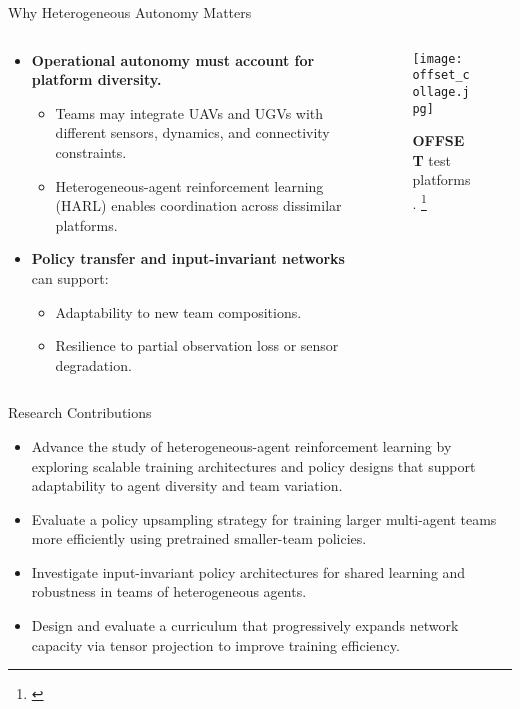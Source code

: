 \documentclass[xcolor={svgnames},aspectratio=169]{beamer}
\begin{document}
\begin{frame}{Why Heterogeneous Autonomy Matters}
\begin{columns}
    \begin{column}{0.6\textwidth}
    \begin{itemize}
        \item \textbf{Operational autonomy must account for platform diversity.}
        \begin{itemize}
            \item Teams may integrate UAVs and UGVs with different sensors, dynamics, and connectivity constraints.
            \item Heterogeneous-agent reinforcement learning (HARL) enables coordination across dissimilar platforms.
        \end{itemize}
        \item \textbf{Policy transfer and input-invariant networks} can support:
        \begin{itemize}
            \item Adaptability to new team compositions.
            \item Resilience to partial observation loss or sensor degradation.
        \end{itemize}
    \end{itemize}
    \end{column}
    \begin{column}{0.4\textwidth}
        \begin{figure}[!h]
            \centering
            \texttt{[image: offset\_collage.jpg]}
            \caption{\textbf{OFFSET} test platforms.
                \footnote[frame]{\cite{zotero-2835}}}
            \label{fig:offset_collage}
        \end{figure}
    \end{column}
\end{columns}
\end{frame}


\begin{frame}{Research Contributions}
    \begin{itemize}
        \item {%
            Advance the study of heterogeneous-agent reinforcement learning by exploring 
            scalable training architectures and policy designs that support adaptability 
            to agent diversity and team variation.}
        \item {%
            Evaluate a policy upsampling strategy for training larger multi-agent teams 
            more efficiently using pretrained smaller-team policies.}
        \item {%
            Investigate input-invariant policy architectures for shared learning and 
            robustness in teams of heterogeneous agents.}
        \item {%
            Design and evaluate a curriculum that progressively expands network capacity 
            via tensor projection to improve training efficiency.}
    \end{itemize}
\end{frame}
\end{document}
